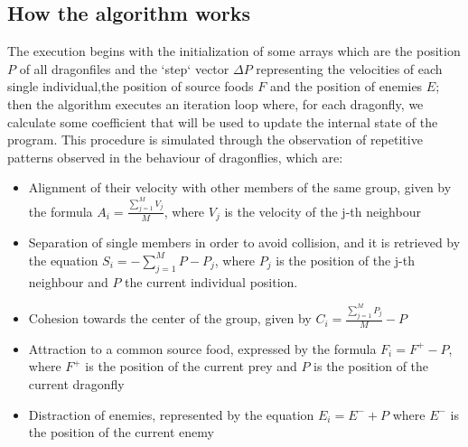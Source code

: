 \documentclass[10pt]{article}
\begin{document}
\begin{multicols}{2}
\subsection*{How the algorithm works}
The execution begins with the initialization of some arrays which are the position $P$ of all dragonfiles and the `step` vector $\Delta P$ representing the velocities of each single individual,the position of source foods $F$ and the position of enemies $E$;
then the algorithm executes an iteration loop where, for each dragonfly, we calculate some coefficient that will be used to update the internal state of the program.
This procedure is simulated through the observation of repetitive patterns observed in the behaviour of dragonflies, which are:



\begin{itemize}
  \item Alignment of their velocity with other members of the same group, given by the formula  $A_i = \frac{\sum^M_{j=1}V_j}{M}$, where $V_j$ is the velocity of the j-th neighbour

  \item Separation of single members in order to avoid collision, and it is retrieved by the equation  $S_i = - \sum^M_{j=1}{P - P_j}$, where $P_j$ is the position of the j-th neighbour and $P$ the current individual position.
    
  \item Cohesion towards the center of the group, given by $C_i = \frac{\sum^M_{j=1}P_j}{M} - P$ 
  \item Attraction to a common source food, expressed by the formula $ F_i = F^+ - P$, where $F^+$ is the position of the current prey and $P$ is the position of the current dragonfly
  \item Distraction of enemies, represented by the equation $ E_i = E^- + P$ where $E^-$ is the position of the current enemy 
\end{itemize}


\end{multicols}
\end{document}
